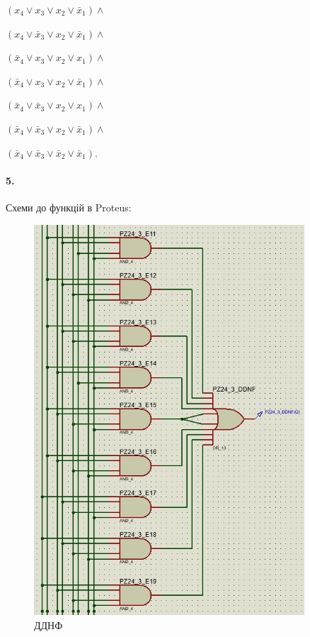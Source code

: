 \documentclass[12pt]{extarticle}
\begin{document}
$(  x_4 \lor  x_3 \lor  x_2 \lor \bar x_1) \land$

$(  x_4 \lor \bar x_3 \lor  x_2 \lor \bar x_1) \land$

$( \bar x_4 \lor  x_3 \lor x_2 \lor  x_1) \land$

$( \bar x_4 \lor x_3 \lor  x_2 \lor \bar x_1) \land$

$( \bar x_4 \lor \bar x_3 \lor x_2 \lor  x_1) \land$

$( \bar x_4 \lor \bar x_3 \lor x_2 \lor \bar x_1) \land$

$( \bar x_4 \lor \bar x_3 \lor \bar x_2 \lor \bar x_1) .$

\break
\paragraph{5.}
Схеми до функцій в Proteus:
\begin{figure}[H]
    \centering
    \includegraphics[width=0.90\textwidth]{ddnf.jpg}
    \caption{ДДНФ}
\end{figure}
\end{document}
